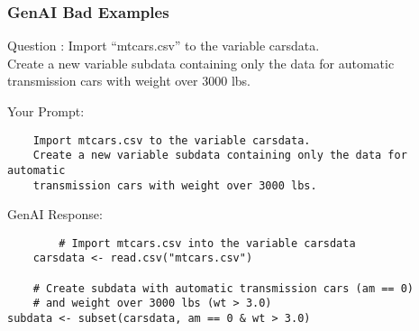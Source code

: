 \documentclass[slidestop,compress,mathserif]{beamer}
\begin{document}



\begin{frame}[fragile]
	\frametitle{GenAI Bad Examples}
	Question : Import ``mtcars.csv'' to the variable carsdata. \\
	Create a new variable subdata containing only the data for automatic transmission cars with weight over 3000 lbs.
	
	Your Prompt:
	\begin{scriptsize}
	\begin{verbatim}
	Import mtcars.csv to the variable carsdata. 
	Create a new variable subdata containing only the data for automatic 
	transmission cars with weight over 3000 lbs.
	\end{verbatim}
	\end{scriptsize}
	GenAI Response:
	
	\begin{scriptsize}
		\begin{verbatim}
		# Import mtcars.csv into the variable carsdata
	carsdata <- read.csv("mtcars.csv")

	# Create subdata with automatic transmission cars (am == 0) 
	# and weight over 3000 lbs (wt > 3.0)
subdata <- subset(carsdata, am == 0 & wt > 3.0)

		\end{verbatim}
	\end{scriptsize}
\end{frame}

\end{document}
